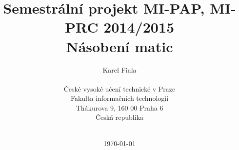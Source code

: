 \documentclass[12pt,a4paper]{article}
\begin{document}
\title{Semestrální projekt MI-PAP, MI-PRC 2014/2015\\
Násobení matic \\
\vspace{10px}}
\author{Karel Fiala \\
\vspace{10px} \\
\small České vysoké učení technické v Praze\\
\small Fakulta informačních technologií\\
\small Thákurova 9, 160 00 Praha 6\\
\small Česká republika \\
\vspace{10px} \\
}
\date{\today}
\maketitle



%
%
%
%
\end{document}
